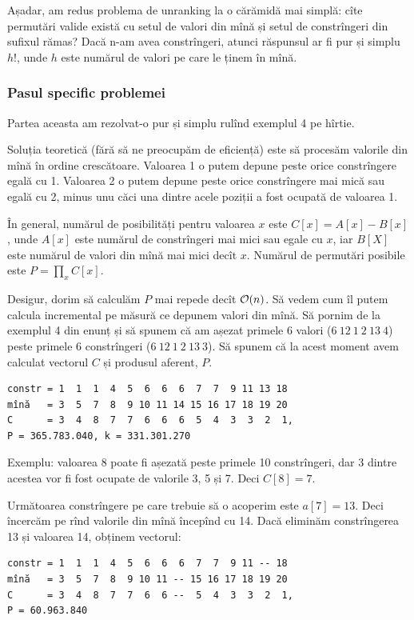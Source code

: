 \documentclass[../main.tex]{subfiles}
\begin{document}
Așadar, am redus problema de unranking la o cărămidă mai simplă: cîte permutări valide există cu setul de valori din mînă și setul de constrîngeri din sufixul rămas? Dacă n-am avea constrîngeri, atunci răspunsul ar fi pur și simplu $h!$, unde $h$ este numărul de valori pe care le ținem în mînă.

\subsubsection*{Pasul specific problemei}

Partea aceasta am rezolvat-o pur și simplu rulînd exemplul 4 pe hîrtie.

Soluția teoretică (fără să ne preocupăm de eficiență) este să procesăm valorile din mînă în ordine crescătoare. Valoarea 1 o putem depune peste orice constrîngere egală cu 1. Valoarea 2 o putem depune peste orice constrîngere mai mică sau egală cu 2, minus unu căci una dintre acele poziții a fost ocupată de valoarea 1.

În general, numărul de posibilități pentru valoarea $x$ este $C[x] = A[x] - B[x]$, unde $A[x]$ este numărul de constrîngeri mai mici sau egale cu $x$, iar $B[X]$ este numărul de valori din mînă mai mici decît $x$. Numărul de permutări posibile este $P = \prod_{x} C[x]$.

Desigur, dorim să calculăm $P$ mai repede decît $\mathcal{O}(n)$. Să vedem cum îl putem calcula incremental pe măsură ce depunem valori din mînă. Să pornim de la exemplul 4 din enunț și să spunem că am așezat primele 6 valori ($6\ 12\ 1\ 2\ 13\ 4$) peste primele 6 constrîngeri ($6\ 12\ 1\ 2\ 13\ 3$).  Să spunem că la acest moment avem calculat vectorul $C$ și produsul aferent, $P$.

\begin{verbatim}
constr = 1  1  1  4  5  6  6  6  7  7  9 11 13 18
mînă   = 3  5  7  8  9 10 11 14 15 16 17 18 19 20
C      = 3  4  8  7  7  6  6  6  5  4  3  3  2  1,
P = 365.783.040, k = 331.301.270
\end{verbatim}

Exemplu: valoarea 8 poate fi așezată peste primele 10 constrîngeri, dar 3 dintre acestea vor fi fost ocupate de valorile 3, 5 și 7. Deci $C[8] = 7$.

Următoarea constrîngere pe care trebuie să o acoperim este $a[7] = 13$. Deci încercăm pe rînd valorile din mînă începînd cu 14. Dacă eliminăm constrîngerea 13 și valoarea 14, obținem vectorul:

\begin{verbatim}
constr = 1  1  1  4  5  6  6  6  7  7  9 11 -- 18
mînă   = 3  5  7  8  9 10 11 -- 15 16 17 18 19 20
C      = 3  4  8  7  7  6  6 --  5  4  3  3  2  1,
P = 60.963.840
\end{verbatim}
\end{document}
